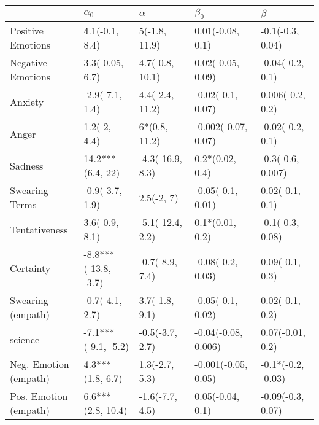 \begin{tabular}{lllll}
\toprule
{} &            $\alpha_0$ &          $\alpha$ &            $\beta_0$ &             $\beta$ \\
\midrule
Positive Emotions     &        4.1(-0.1, 8.4) &     5(-1.8, 11.9) &     0.01(-0.08, 0.1) &    -0.1(-0.3, 0.04) \\
Negative Emotions     &       3.3(-0.05, 6.7) &   4.7(-0.8, 10.1) &    0.02(-0.05, 0.09) &    -0.04(-0.2, 0.1) \\
Anxiety               &       -2.9(-7.1, 1.4) &   4.4(-2.4, 11.2) &    -0.02(-0.1, 0.07) &    0.006(-0.2, 0.2) \\
Anger                 &          1.2(-2, 4.4) &     6*(0.8, 11.2) &  -0.002(-0.07, 0.07) &    -0.02(-0.2, 0.1) \\
Sadness               &      14.2***(6.4, 22) &  -4.3(-16.9, 8.3) &      0.2*(0.02, 0.4) &   -0.3(-0.6, 0.007) \\
Swearing Terms        &       -0.9(-3.7, 1.9) &        2.5(-2, 7) &    -0.05(-0.1, 0.01) &     0.02(-0.1, 0.1) \\
Tentativeness         &        3.6(-0.9, 8.1) &  -5.1(-12.4, 2.2) &      0.1*(0.01, 0.2) &    -0.1(-0.3, 0.08) \\
Certainty             &  -8.8***(-13.8, -3.7) &   -0.7(-8.9, 7.4) &    -0.08(-0.2, 0.03) &     0.09(-0.1, 0.3) \\
Swearing (empath)     &       -0.7(-4.1, 2.7) &    3.7(-1.8, 9.1) &    -0.05(-0.1, 0.02) &     0.02(-0.1, 0.2) \\
science               &   -7.1***(-9.1, -5.2) &   -0.5(-3.7, 2.7) &  -0.04(-0.08, 0.006) &    0.07(-0.01, 0.2) \\
Neg. Emotion (empath) &      4.3***(1.8, 6.7) &    1.3(-2.7, 5.3) &  -0.001(-0.05, 0.05) &  -0.1*(-0.2, -0.03) \\
Pos. Emotion (empath) &     6.6***(2.8, 10.4) &   -1.6(-7.7, 4.5) &     0.05(-0.04, 0.1) &   -0.09(-0.3, 0.07) \\
\bottomrule
\end{tabular}
